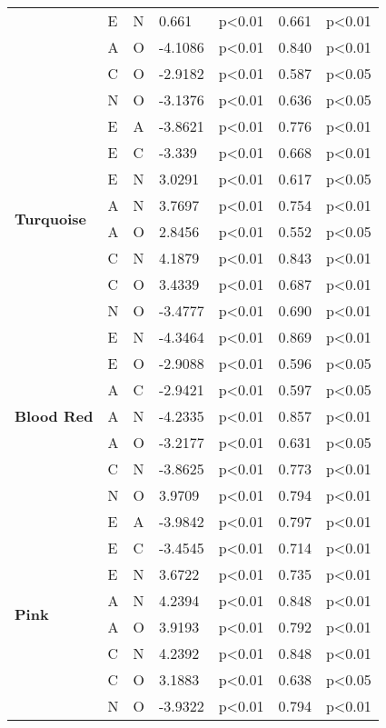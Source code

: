 \begin{longtable}{ |p{1.9cm}| p{0.5cm}|p{0.5cm}|p{1.2cm}| p{1.9cm}|p{1cm}|p{1.5cm}|  }
&E	&N	&0.661		&p<0.01	&0.661	&p<0.01\\
&A	&O	&-4.1086		&p<0.01	&0.840	&p<0.01\\
&C	&O	&-2.9182		&p<0.01	&0.587	&p<0.05\\
&N	&O	&-3.1376		&p<0.01	&0.636	&p<0.05\\
\hline 
\hline 
\multirow{8}{*}{\textbf{Turquoise}} 
&E			&A				&-3.8621			&p<0.01			&0.776		&p<0.01\\
&E			&C				&-3.339			&p<0.01			&0.668		&p<0.01\\
&E			&N				&3.0291			&p<0.01			&0.617		&p<0.05\\
&A			&N				&3.7697			&p<0.01			&0.754		&p<0.01\\
&A			&O				&2.8456			&p<0.01			&0.552		&p<0.05\\
&C			&N				&4.1879			&p<0.01			&0.843		&p<0.01\\
&C			&O				&3.4339			&p<0.01			&0.687		&p<0.01\\
&N			&O				&-3.4777			&p<0.01			&0.690 		&p<0.01\\
\hline 
\hline 
\multirow{7}{*}{\textbf{Blood Red}} 
&E			&N				&-4.3464			&p<0.01			&0.869		&p<0.01\\
&E			&O				&-2.9088			&p<0.01			&0.596		&p<0.05\\
&A			&C				&-2.9421			&p<0.01			&0.597		&p<0.05\\
&A			&N				&-4.2335			&p<0.01			&0.857		&p<0.01\\
&A			&O				&-3.2177			&p<0.01			&0.631		&p<0.05\\
&C			&N				&-3.8625			&p<0.01			&0.773		&p<0.01\\
&N			&O				&3.9709			&p<0.01			&0.794		&p<0.01\\
\hline 
\hline 
\multirow{8}{*}{\textbf{Pink}} 
&E			&A				&-3.9842			&p<0.01			&0.797		&p<0.01\\
&E			&C				&-3.4545			&p<0.01			&0.714		&p<0.01\\
&E			&N				&3.6722			&p<0.01			&0.735		&p<0.01\\
&A			&N				&4.2394			&p<0.01			&0.848		&p<0.01\\
&A			&O				&3.9193			&p<0.01			&0.792		&p<0.01\\
&C			&N				&4.2392			&p<0.01			&0.848		&p<0.01\\
&C			&O				&3.1883			&p<0.01			&0.638		&p<0.05\\
&N			&O				&-3.9322			&p<0.01			&0.794		&p<0.01\\
\hline 
\end{longtable}


